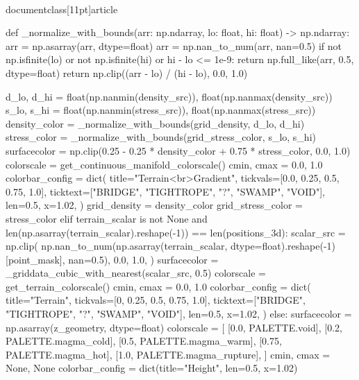 \\documentclass[11pt]{article}
\begin{document}
\begin{CodeBlock}
        def _normalize_with_bounds(arr: np.ndarray, lo: float, hi: float) -> np.ndarray:
            arr = np.asarray(arr, dtype=float)
            arr = np.nan_to_num(arr, nan=0.5)
            if not np.isfinite(lo) or not np.isfinite(hi) or hi - lo <= 1e-9:
                return np.full_like(arr, 0.5, dtype=float)
            return np.clip((arr - lo) / (hi - lo), 0.0, 1.0)

        d_lo, d_hi = float(np.nanmin(density_src)), float(np.nanmax(density_src))
        s_lo, s_hi = float(np.nanmin(stress_src)), float(np.nanmax(stress_src))
        density_color = _normalize_with_bounds(grid_density, d_lo, d_hi)
        stress_color = _normalize_with_bounds(grid_stress_color, s_lo, s_hi)
        surfacecolor = np.clip(0.25 - 0.25 * density_color + 0.75 * stress_color, 0.0, 1.0)
        colorscale = get_continuous_manifold_colorscale()
        cmin, cmax = 0.0, 1.0
        colorbar_config = dict(
            title="Terrain<br>Gradient",
            tickvals=[0.0, 0.25, 0.5, 0.75, 1.0],
            ticktext=["BRIDGE", "TIGHTROPE", "?", "SWAMP", "VOID"],
            len=0.5,
            x=1.02,
        )
        grid_density = density_color
        grid_stress_color = stress_color
    elif terrain_scalar is not None and len(np.asarray(terrain_scalar).reshape(-1)) == len(positions_3d):
        scalar_src = np.clip(
            np.nan_to_num(np.asarray(terrain_scalar, dtype=float).reshape(-1)[point_mask], nan=0.5),
            0.0,
            1.0,
        )
        surfacecolor = _griddata_cubic_with_nearest(scalar_src, 0.5)
        colorscale = get_terrain_colorscale()
        cmin, cmax = 0.0, 1.0
        colorbar_config = dict(
            title="Terrain",
            tickvals=[0, 0.25, 0.5, 0.75, 1.0],
            ticktext=["BRIDGE", "TIGHTROPE", "?", "SWAMP", "VOID"],
            len=0.5,
            x=1.02,
        )
    else:
        surfacecolor = np.asarray(z_geometry, dtype=float)
        colorscale = [
            [0.0, PALETTE.void],
            [0.2, PALETTE.magma_cold],
            [0.5, PALETTE.magma_warm],
            [0.75, PALETTE.magma_hot],
            [1.0, PALETTE.magma_rupture],
        ]
        cmin, cmax = None, None
        colorbar_config = dict(title="Height", len=0.5, x=1.02)


\end{CodeBlock}
\end{document}

